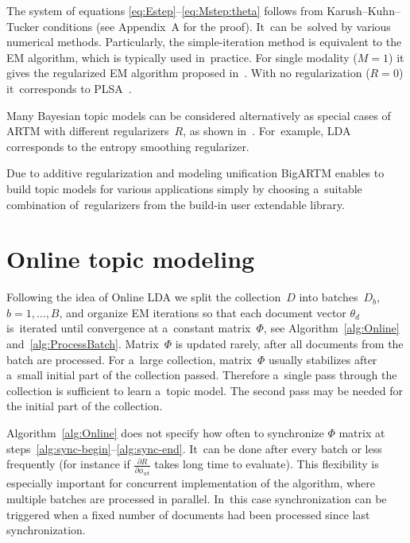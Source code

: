 \documentclass[russian]{llncs}
\begin{document}
The system of equations \eqref{eq:Estep}--\eqref{eq:Mstep:theta}
follows from Karush--Kuhn--Tucker conditions (see Appendix~A for the proof).
It~can be~solved by various numerical methods.
Particularly,
the simple-iteration method is equivalent to the EM algorithm,
which is typically used in~practice.
For single modality (${M=1}$) it gives the regularized EM algorithm
proposed in~\cite{voron14dan-eng}.
With no regularization (${R=0}$) it~corresponds to PLSA~\cite{hofmann99plsi}.

Many Bayesian topic models can be considered alternatively
as special cases of ARTM with different regularizers~$R$,
as shown in~\cite{voron14aist,voron14mlj}.
For~example,
LDA~\cite{blei03latent} corresponds to the entropy smoothing regularizer.

Due to additive regularization and modeling unification 
BigARTM enables to build topic models for various applications
simply by choosing a~suitable combination of~regularizers
from the build-in user extendable library.

\section{Online topic modeling}
\label{sec:Online}

Following the idea of Online LDA \cite{hoffman10online}
we split the collection~$D$ into batches~$D_b$, ${b=1,\dots,B}$,
and organize EM iterations so that
each document vector $\theta_d$ is~iterated until convergence at a~constant matrix~$\Phi$,
see Algorithm~\ref{alg:Online} and~\ref{alg:ProcessBatch}.
Matrix~$\Phi$ is updated rarely, after all documents from the batch are processed.
For a~large collection,
matrix~$\Phi$ usually stabilizes after a~small initial part of the collection passed.
Therefore a~single pass through the collection is sufficient to learn a~topic model.
The second pass may be needed for the initial part of the collection.

Algorithm~\ref{alg:Online} does not specify how often to synchronize $\Phi$ matrix 
at steps~\ref{alg:sync-begin}--\ref{alg:sync-end}.
It~can be done after every batch or less frequently
(for instance if $\frac{\partial R}{\partial \phi_{wt}}$ takes long time to evaluate).
This flexibility is especially important for concurrent implementation of the algorithm,
where multiple batches are processed in parallel.
In~this case synchronization can be triggered when a fixed number of documents had been processed since last synchronization.
\end{document}
